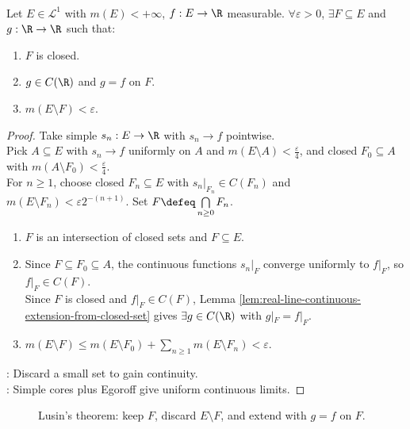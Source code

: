 \begin{theorem} \label{thm:lusin-theorem-finite-measure-real-line} \\
Let $E\in\mathcal{L}^1$ with $m(E)<+\infty$, $f:E\to\R$ measurable. $\forall \varepsilon>0$, $\exists F\subseteq E$ and $g:\R\to\R$ such that:
\begin{enumerate}[label=(\roman*)]
\setlength{\itemsep}{0pt}
\item $F$ is closed.
\item $g\in C(\R)$ and $g=f$ on $F$.
\item $m(E\setminus F)<\varepsilon$.
\end{enumerate}
\begin{proof} Take simple $s_n:E\to\R$ with $s_n\to f$ pointwise.\\
Pick $A\subseteq E$ with $s_n\to f$ uniformly on $A$ and $m(E\setminus A)<\frac{\varepsilon}{4}$, and closed $F_0\subseteq A$ with $m(A\setminus F_0)<\frac{\varepsilon}{4}$.\\
For $n\geq1$, choose closed $F_n\subseteq E$ with $s_n|_{F_n}\in C(F_n)$ and $m(E\setminus F_n)<\varepsilon2^{-(n+1)}$. Set $F\defeq\bigcap\limits_{n\geq0}F_n$.
\begin{enumerate}[label=(\roman*)]
\setlength{\itemsep}{0pt}
\item $F$ is an intersection of closed sets and $F\subseteq E$.
\item Since $F\subseteq F_0\subseteq A$, the continuous functions $s_n|_F$ converge uniformly to $f|_F$, so $f|_F\in C(F)$.\\
Since $F$ is closed and $f|_F\in C(F)$, Lemma \ref{lem:real-line-continuous-extension-from-closed-set} gives $\exists g\in C(\R)$ with $g|_F=f|_F$.
\item $m(E\setminus F)\leq m(E\setminus F_0)+\sum\limits_{n\geq1}m(E\setminus F_n)<\varepsilon$.
\end{enumerate}
: Discard a small set to gain continuity.\\
: Simple cores plus Egoroff give uniform continuous limits.
\end{proof}
\end{theorem}

\begin{figure}[H]
  \centering
  
  \caption{Lusin's theorem: keep \textcolor{blue!70!black}{$F$}, discard \textcolor{red!70!black}{$E\setminus F$}, and extend with \textcolor{green!45!black}{$g=f$ on $F$}.}
  \label{fig:lusin-large-closed-set}
\end{figure}
